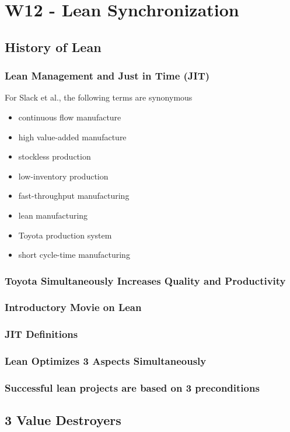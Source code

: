 \section{W12 - Lean Synchronization}
\subsection{History of Lean }
\subsubsection{Lean Management and Just in Time (JIT)}
For Slack et al., the following terms are synonymous
\begin{itemize}
	\item continuous flow manufacture
	\item high value-added manufacture
	\item stockless production
	\item low-inventory production
	\item fast-throughput manufacturing
	\item lean manufacturing
	\item Toyota production system
	\item short cycle-time manufacturing
\end{itemize}
\subsubsection{Toyota Simultaneously Increases Quality and Productivity}
\subsubsection{Introductory Movie on Lean }
\subsubsection{JIT Definitions}
\subsubsection{Lean Optimizes 3 Aspects Simultaneously}
\subsubsection{Successful lean projects are based on 3 preconditions}
\subsection{3 Value Destroyers}
